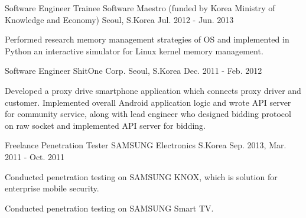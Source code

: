 \begin{cventries}
  \cventry
    {Software Engineer Trainee} %
    {Software Maestro (funded by Korea Ministry of Knowledge and Economy)} %
    {Seoul, S.Korea} %
    {Jul. 2012 - Jun. 2013} %
    {
      \begin{cvitems} %
        \item {Performed research memory management strategies of OS and implemented in Python an interactive simulator for Linux kernel memory management.}
      \end{cvitems}
    }

  \cventry
    {Software Engineer} %
    {ShitOne Corp.} %
    {Seoul, S.Korea} %
    {Dec. 2011 - Feb. 2012} %
    {
      \begin{cvitems} %
        \item {Developed a proxy drive smartphone application which connects proxy driver and customer. Implemented overall Android application logic and wrote API server for community service, along with lead engineer who designed bidding protocol on raw socket and implemented API server for bidding.}
      \end{cvitems}
    }

  \cventry
    {Freelance Penetration Tester} %
    {SAMSUNG Electronics} %
    {S.Korea} %
    {Sep. 2013, Mar. 2011 - Oct. 2011} %
    {
      \begin{cvitems} %
        \item {Conducted penetration testing on SAMSUNG KNOX, which is solution for enterprise mobile security.}
        \item {Conducted penetration testing on SAMSUNG Smart TV.}
      \end{cvitems}
    }

\end{cventries}
